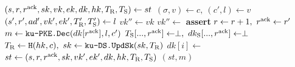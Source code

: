 \algrenewcommand\textproc{}
\algrenewcommand{}

\begin{minipage}{1\linewidth}
  {\fontsize{8}{10}\selectfont
  \begin{algorithmic}[1]
    \State $(s,r,r^\text{ack},sk,vk,ek,dk,hk,T_\text{R},T_\text{S}) \gets st$
    \State $(\sigma,v) \gets c, \ (c',l) \gets v$
    \State $(s',r',ad',vk',ek',T_\text{R}',T_\text{S}') \gets l$
    \State $vk'' \gets vk$
    \State $vk'' \gets$ 
    \EndFor
    \State \textbf{assert} 
    \State $r \gets r+1, \ r^\t{ack} \gets r'$
    \State $m \gets \texttt{ku-PKE.Dec}(dk[r^\text{ack}],l,c')$
    \State $T_\t{S}[...,r^\t{ack}] \gets \perp, \ dk_\t{S}[...,r^\t{ack}] \gets \perp$
    \State $T_\text{R} \gets \texttt{H}(hk,c), \ sk \gets \texttt{ku-DS.UpdSk}(sk,T_\text{R})$
    \State $dk[i] \gets$ 
    \EndFor
    \State $st \gets (s,r,r^\text{ack},sk,vk',ek',dk,hk,T_\text{R},T_\text{S})$
    \State \Return $(st,m)$
    \EndProcedure
  \end{algorithmic}
  }
\end{minipage}